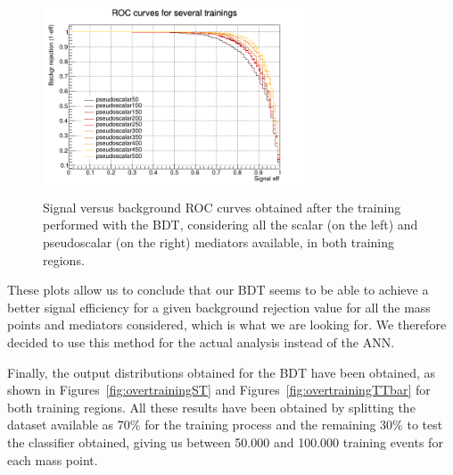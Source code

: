 \documentclass[a4paper, 10pt, openright]{report}
\begin{document}
\begin{figure}[htbp]
{\begin{minipage}[b]{.49\textwidth}
\includegraphics[width=7.8cm, height=5.8cm]{figs/groupedROC_pseudo_TTbar.png}
\end{minipage} \hfill
}
\caption{Signal versus background \ac{ROC} curves obtained after the training performed with the \ac{BDT}, considering all the scalar (on the left) and pseudoscalar (on the right) mediators available, in both training regions.}
\label{fig:ROC2}
\end{figure}

These plots allow us to conclude that our \ac{BDT} seems to be able to achieve a better signal efficiency for a given background rejection value for all the mass points and mediators considered, which is what we are looking for. We therefore decided to use this method for the actual analysis instead of the \ac{ANN}.

Finally, the output distributions obtained for the \ac{BDT} have been obtained, as shown in Figures~\ref{fig:overtrainingST} and Figures~\ref{fig:overtrainingTTbar} for both training regions. All these results have been obtained by splitting the dataset available as 70\% for the training process and the remaining 30\% to test the classifier obtained, giving us between 50.000 and 100.000 training events for each mass point.
\end{document}
